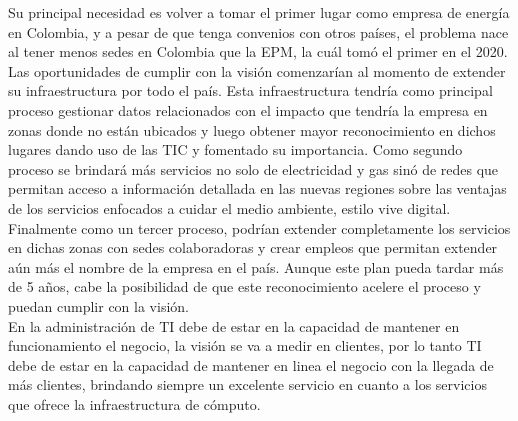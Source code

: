 Su principal necesidad es volver a tomar el primer lugar como empresa de energía en Colombia, 
y a pesar de que tenga convenios con otros países, el problema nace al tener menos sedes en Colombia que la EPM, 
la cuál tomó el primer en el 2020. 
Las oportunidades de cumplir con la visión comenzarían al momento de extender su infraestructura por todo el país. 
Esta infraestructura tendría como principal proceso gestionar datos relacionados con el impacto 
que tendría la empresa en zonas donde no están ubicados y luego obtener mayor reconocimiento en dichos lugares 
dando uso de las TIC y fomentado su importancia. Como segundo proceso se brindará más servicios no solo de electricidad 
y gas sinó de redes que permitan acceso a información detallada en las nuevas regiones sobre las ventajas de los servicios 
enfocados a cuidar el medio ambiente, estilo vive digital. Finalmente como un tercer proceso, 
podrían extender completamente los servicios en dichas zonas con sedes colaboradoras y crear empleos 
que permitan extender aún más el nombre de la empresa en el país. Aunque este plan pueda tardar más de 5 años, 
cabe la posibilidad de que este reconocimiento acelere el proceso y puedan cumplir con la visión.  \\

En la administración de TI debe de estar en la capacidad de mantener en funcionamiento el negocio, la visión se va a medir en clientes, por lo tanto TI debe de estar en la capacidad de mantener en linea el negocio con la llegada de más clientes, brindando siempre un excelente servicio en cuanto a los servicios que ofrece la infraestructura de cómputo. \\

